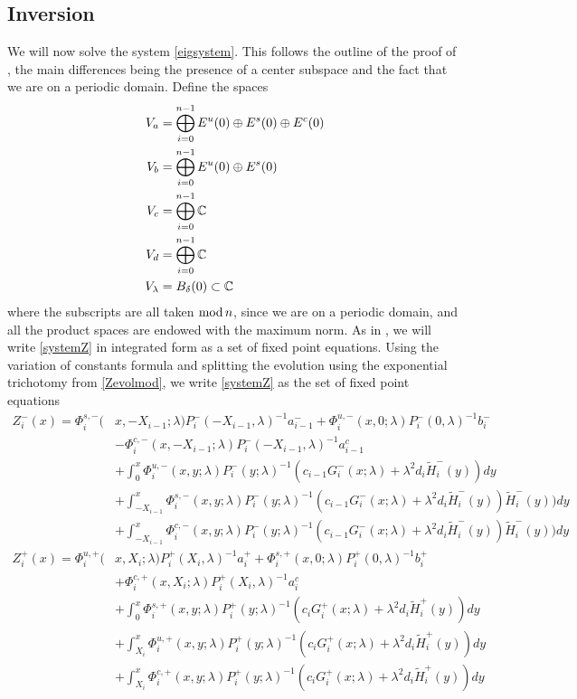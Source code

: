 \documentclass[10pt,reqno]{amsart}
\theoremstyle{plain}
\theoremstyle{definition}
\theoremstyle{remark}
\numberwithin{theorem}{section}
\numberwithin{equation}{section}
\begin{document}
\subsection{Inversion}

We will now solve the system \cref{eigsystem}. This follows the outline of the proof of \cite[Theorem 2]{Sandstede1998}, the main differences being the presence of a center subspace and the fact that we are on a periodic domain. Define the spaces
\begin{align*}
V_a &= \bigoplus_{i=0}^{n-1} E^u(0) \oplus E^s(0) \oplus E^c(0) \\
V_b &= \bigoplus_{i=0}^{n-1} E^u(0) \oplus E^s(0) \\
V_c &= \bigoplus_{i=0}^{n-1} \mathbb{C} \\
V_d &= \bigoplus_{i=0}^{n-1} \mathbb{C} \\
V_\lambda &= B_\delta(0) \subset \mathbb{C}
\end{align*}
where the subscripts are all taken $\mathop\mathrm{mod}\nolimits n$, since we are on a periodic domain, and all the product spaces are endowed with the maximum norm. As in \cite{Sandstede1998}, we will write \eqref{systemZ} in integrated form as a set of fixed point equations. Using the variation of constants formula and splitting the evolution using the exponential trichotomy from \cref{Zevolmod}, we write \eqref{systemZ} as the set of fixed point equations
\begin{equation}\label{Zfpeq}
\begin{aligned}
Z_i^-(x) = \Phi_i^{s,-}(&x, -X_{i-1}; \lambda) P_i^-(-X_{i-1}, \lambda)^{-1} a_{i-1}^- + \Phi_i^{u,-}(x, 0; \lambda) P_i^-(0, \lambda)^{-1} b_i^- \\
&- \Phi_i^{c,-}(x, -X_{i-1}; \lambda) P_i^-(-X_{i-1}, \lambda)^{-1} a_{i-1}^c \\
&+ \int_0^x \Phi_i^{u,-}(x, y; \lambda)P_i^-(y; \lambda)^{-1}(c_{i-1} G_i^-(x; \lambda) + \lambda^2 d_i \tilde{H}_i^-(y)) dy \\
&+ \int_{-X_{i-1}}^x \Phi_i^{s,-}(x, y; \lambda) P_i^-(y; \lambda)^{-1} (c_{i-1} G_i^-(x; \lambda) + \lambda^2 d_i \tilde{H}_i^-(y)) \tilde{H}_i^-(y)) dy \\
&+ \int_{-X_{i-1}}^x \Phi_i^{c,-}(x, y; \lambda) P_i^-(y; \lambda)^{-1} (c_{i-1} G_i^-(x; \lambda) + \lambda^2 d_i \tilde{H}_i^-(y)) \tilde{H}_i^-(y)) dy  \\ 
Z_i^+(x) = \Phi_i^{u,+}(&x, X_i; \lambda) P_i^+(X_i, \lambda)^{-1} a_i^+ + \Phi_i^{s,+}(x, 0; \lambda) P_i^+(0, \lambda)^{-1}b_i^+ \\
&+ \Phi_i^{c,+}(x, X_i; \lambda) P_i^+(X_i, \lambda)^{-1} a_i^c \\
&+ \int_0^x \Phi_i^{s,+}(x, y; \lambda) P_i^+(y; \lambda)^{-1} (c_i G_i^+(x; \lambda) + \lambda^2 d_i \tilde{H}_i^+(y)) dy \\
&+ \int_{X_i}^x \Phi_i^{u,+}(x, y; \lambda) P_i^+(y; \lambda)^{-1}( c_i G_i^+(x; \lambda) + \lambda^2 d_i \tilde{H}_i^+(y)) dy \\
&+ \int_{X_i}^x \Phi_i^{c,+}(x, y; \lambda) P_i^+(y; \lambda)^{-1}( c_i G_i^+(x; \lambda) + \lambda^2 d_i \tilde{H}_i^+(y)) dy 
\end{aligned}
\end{equation}
\end{document}
